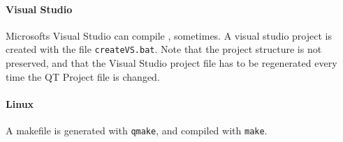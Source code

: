 \paragraph{Visual Studio}
Microsofts Visual Studio can compile \ER, sometimes.
A visual studio project is created with the file \texttt{createVS.bat}.
Note that the project structure is not preserved, and that the Visual Studio project file has to be regenerated every time the QT Project file is changed.

\paragraph{Linux}
A makefile is generated with \texttt{qmake}, and compiled with \texttt{make}.
